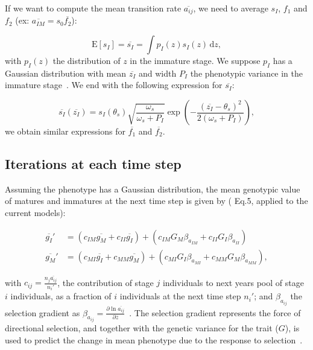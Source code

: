 If we want to compute the mean transition rate $\overline{a_{ij}}$, we need to average $s_I$, $f_1$ and $f_2$ (ex: $\overline{a_{IM}} = s_0 \overline{f_2}$):

\begin{equation}
	\mathrm{E}[s_I] = \overline{s_I} = \int p_I(z)s_I(z)\,\text{d}z,
\end{equation}
with $p_I(z)$ the distribution of $z$ in the immature stage. We suppose $p_I$ has a Gaussian distribution with mean $\overline{z_I}$ and width $P_I$ the phenotypic variance in the immature stage~\citep{lande_quantitative_1982}. We end with the following expression for $\overline{s_I}$:

\begin{equation}
	\label{eq:poplht}
	\overline{s_{I}}(\overline{z_{I}}) = s_{I}(\theta_{s}) \sqrt{\frac{\omega_{s}}{\omega_{s}+P_{I}}}	\exp\left(-\frac{(\overline{z_{I}} - \theta_{s})^2}{2(\omega_{s}+P_{I})}\right),
\end{equation}
we obtain similar expressions for $\overline{f_1}$ and $\overline{f_2}$.	

\subsection*{Iterations at each time step}

Assuming the phenotype has a Gaussian distribution,  the mean genotypic value of matures and immatures at the next time step is given by (\citealt{barfield_evolution_2011} Eq.5, applied to the current models):

\begin{subequations}
	\begin{align}
		\label{eq:genotypic}
		\overline{g_{I}}' &= (c_{I M} \overline{g_{M}} + c_{I I} \overline{g_{I}}) + 
			(c_{I M} G_M \beta_{a_{IM}} + c_{I I} G_I \beta_{a_{II}}) \\
		\overline{g_{M}}' &=	 (c_{M I} \overline{g_{I}} + c_{M M} \overline{g_{M}})  +
				(c_{M I} G_I \beta_{a_{MI}} + c_{M M} G_M \beta_{a_{MM}}),
	\end{align}
\end{subequations}

with $c_{ij} = \frac{n_j \overline{a_{ij}}}{n_i'}$, the contribution of stage $j$ individuals to next years pool of stage $i$ individuals, as a fraction of $i$ individuals at the next time step $n_i'$; and $\beta_{a_{ij}}$ the selection gradient as $\beta_{a_{ij}} = \frac{\partial \ln \overline{a_{ij}}}{\partial \overline{z}}$~\citep{barfield_evolution_2011}. The selection gradient represents the force of directional selection, and together with the genetic variance for the trait ($G$), is used to predict the change in mean phenotype due to the response to selection~\citep{lande_quantitative_1982}.

